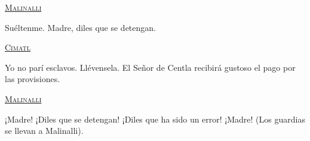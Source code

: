 \begin{center}
\textsc{\underline{Malinalli}}
\\
\par
Suéltenme. Madre, diles que se detengan.
\\
\par
\textsc{\underline{Cimatl}}
\\
\par
Yo no parí esclavos. Llévensela. El Señor de Centla recibirá gustoso el pago por las provisiones.
\\
\par
\textsc{\underline{Malinalli}}
\\
\par
¡Madre! ¡Diles que se detengan! ¡Diles que ha sido un error! ¡Madre! (Los guardias se llevan a Malinalli).
\end{center}